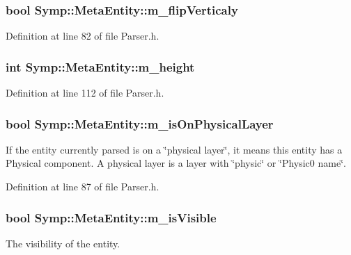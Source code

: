 \hypertarget{struct_symp_1_1_meta_entity_a29aeeb45d00a16261d588aa2e1d40558}{
\subsubsection[{m\-\_\-flip\-Verticaly}]{\setlength{\rightskip}{0pt plus 5cm}bool Symp\-::\-Meta\-Entity\-::m\-\_\-flip\-Verticaly}}\label{struct_symp_1_1_meta_entity_a29aeeb45d00a16261d588aa2e1d40558}


Definition at line 82 of file Parser.\-h.

\hypertarget{struct_symp_1_1_meta_entity_a95a266c420e49e4d08337d77c4b8d302}{
\subsubsection[{m\-\_\-height}]{\setlength{\rightskip}{0pt plus 5cm}int Symp\-::\-Meta\-Entity\-::m\-\_\-height}}\label{struct_symp_1_1_meta_entity_a95a266c420e49e4d08337d77c4b8d302}


Definition at line 112 of file Parser.\-h.

\hypertarget{struct_symp_1_1_meta_entity_af3a8446adc01d502b3f7ae7a810d6bac}{
\subsubsection[{m\-\_\-is\-On\-Physical\-Layer}]{\setlength{\rightskip}{0pt plus 5cm}bool Symp\-::\-Meta\-Entity\-::m\-\_\-is\-On\-Physical\-Layer}}\label{struct_symp_1_1_meta_entity_af3a8446adc01d502b3f7ae7a810d6bac}
If the entity currently parsed is on a \char`\"{}physical layer\char`\"{}, it means this entity has a Physical component. A physical layer is a layer with \char`\"{}physic\char`\"{} or \char`\"{}\-Physic0 name\char`\"{}. 

Definition at line 87 of file Parser.\-h.

\hypertarget{struct_symp_1_1_meta_entity_a330c05dfb269e00b4baac0e9471d388f}{
\subsubsection[{m\-\_\-is\-Visible}]{\setlength{\rightskip}{0pt plus 5cm}bool Symp\-::\-Meta\-Entity\-::m\-\_\-is\-Visible}}\label{struct_symp_1_1_meta_entity_a330c05dfb269e00b4baac0e9471d388f}
The visibility of the entity. 

